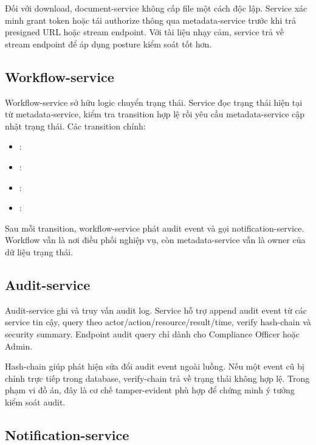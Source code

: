 Đối với download, document-service không cấp file một cách độc lập. Service xác minh grant token hoặc tái authorize thông qua metadata-service trước khi trả presigned URL hoặc stream endpoint. Với tài liệu nhạy cảm, service trả về stream endpoint để áp dụng posture kiểm soát tốt hơn.

\subsection{Workflow-service}

Workflow-service sở hữu logic chuyển trạng thái. Service đọc trạng thái hiện tại từ metadata-service, kiểm tra transition hợp lệ rồi yêu cầu metadata-service cập nhật trạng thái. Các transition chính:

\begin{itemize}
  \item {}: 
  \item {}: 
  \item {}: 
  \item {}: 
\end{itemize}

Sau mỗi transition, workflow-service phát audit event và gọi notification-service. Workflow vẫn là nơi điều phối nghiệp vụ, còn metadata-service vẫn là owner của dữ liệu trạng thái.

\subsection{Audit-service}

Audit-service ghi và truy vấn audit log. Service hỗ trợ append audit event từ các service tin cậy, query theo actor/action/resource/result/time, verify hash-chain và security summary. Endpoint audit query chỉ dành cho Compliance Officer hoặc Admin.

Hash-chain giúp phát hiện sửa đổi audit event ngoài luồng. Nếu một event cũ bị chỉnh trực tiếp trong database, verify-chain trả về trạng thái không hợp lệ. Trong phạm vi đồ án, đây là cơ chế tamper-evident phù hợp để chứng minh ý tưởng kiểm soát audit.

\subsection{Notification-service}
\label{sec:notification-service}

